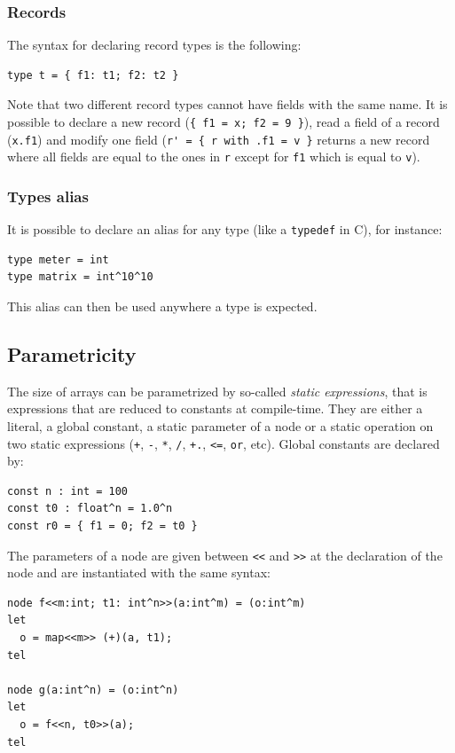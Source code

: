 \documentclass[a4paper]{article}
\begin{document}
\subsubsection{Records}

The syntax for declaring record types is the following:
\begin{lstlisting}
type t = { f1: t1; f2: t2 }
\end{lstlisting}
Note that two different record types cannot have fields with the same name.
It is possible to declare a new record (\lstinline+{ f1 = x; f2 = 9 }+), read a field of a record (\lstinline+x.f1+) and modify one field (\lstinline+r' = { r with .f1 = v }+ returns a new record where all fields are equal to the ones in \lstinline+r+ except for \lstinline+f1+ which is equal to \lstinline+v+). 

\subsubsection{Types alias}

It is possible to declare an alias for any type (like a \texttt{typedef} in C), for instance:
\begin{lstlisting}
type meter = int
type matrix = int^10^10
\end{lstlisting}
This alias can then be used anywhere a type is expected.


\subsection{Parametricity}

The size of arrays can be parametrized by so-called \emph{static expressions}, that is expressions that are reduced to constants at compile-time. They are either a literal, a global constant, a static parameter of a node or a static operation on two static expressions (\lstinline{+}, \lstinline{-}, \lstinline{*}, \lstinline{/}, \lstinline{+.}, \lstinline{<=}, \lstinline{or}, etc). Global constants are declared by:
\begin{lstlisting}
const n : int = 100
const t0 : float^n = 1.0^n
const r0 = { f1 = 0; f2 = t0 }
\end{lstlisting}

The parameters of a node are given between \lstinline+<<+ and \lstinline{>>} at the declaration of the node and are instantiated with the same syntax:
\begin{lstlisting}
node f<<m:int; t1: int^n>>(a:int^m) = (o:int^m)
let
  o = map<<m>> (+)(a, t1);
tel

node g(a:int^n) = (o:int^n)
let
  o = f<<n, t0>>(a);
tel
\end{lstlisting}
\end{document}
